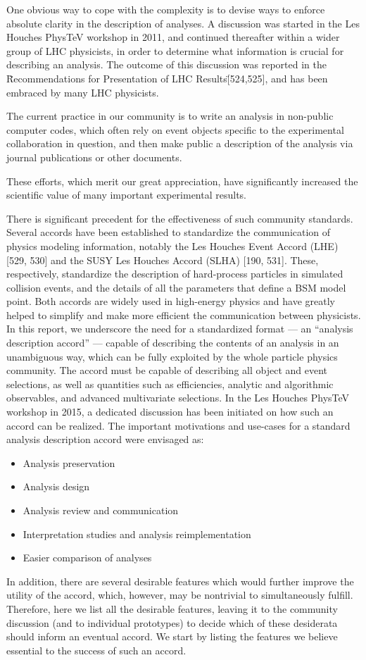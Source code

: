 \documentclass[11pt]{cernrep}
\begin{document}
One obvious way to cope with the complexity is to devise ways to enforce absolute clarity in the description of analyses.
A discussion was started in the Les Houches PhysTeV workshop in 2011, and continued
thereafter within a wider group of LHC physicists, in order to determine what information is
crucial for describing an analysis. The outcome of this discussion was reported in the
\"Recommendations for Presentation of LHC Results\" [524,525], and has been embraced by many LHC physicists.

The current practice in our community is to write an analysis in non-public computer codes,
which often rely on event objects specific to the experimental collaboration in question,
and then make public a description of the analysis via journal publications or other documents.

These efforts, which merit our great appreciation,
have significantly increased the scientific value of many important experimental results.

There is significant precedent for the effectiveness of such community standards. Several
accords have been established to standardize the communication of physics modeling information,
notably the Les Houches Event Accord (LHE) [529, 530] and the SUSY Les Houches Accord (SLHA) [190, 531].
These, respectively, standardize the description of hard-process
particles in simulated collision events, and the details of all the parameters that define a BSM model point.
Both accords are widely used in high-energy physics and have greatly helped to
simplify and make more efficient the communication between physicists.
In this report, we underscore the need for a standardized format — an “analysis description
accord” — capable of describing the contents of an analysis in an unambiguous way, which can
be fully exploited by the whole particle physics community.  The accord must be capable of
describing all object and event selections, as well as quantities such as efficiencies, analytic and
algorithmic observables, and advanced multivariate selections.
In the Les Houches PhysTeV workshop in 2015, a dedicated discussion has been initiated
on how such an accord can be realized.
The important motivations and use-cases for a standard analysis description accord were envisaged as:
\begin{itemize}
  \item Analysis preservation
  \item Analysis design
  \item Analysis review and communication
  \item Interpretation studies and analysis reimplementation
  \item Easier comparison of analyses
\end{itemize}
In addition, there are several desirable features which would further improve the utility
of the accord, which, however, may be nontrivial to simultaneously fulfill.  Therefore, here
we list all the desirable features, leaving it to the community discussion (and to individual
prototypes) to decide which of these desiderata should inform an eventual accord. We start by
listing the features we believe essential to the success of such an accord.
\end{document}
